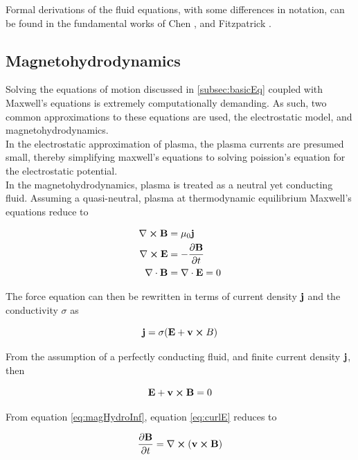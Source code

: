 Formal derivations of the fluid equations, with some differences in notation, can be found in the fundamental works of Chen \parencite{Chen2018}, and Fitzpatrick \parencite{Fitzpatrick2015}.

\subsection{Magnetohydrodynamics}
Solving the equations of motion discussed in \ref{subsec:basicEq} coupled with Maxwell's equations is extremely computationally demanding. As such, two common approximations to these equations are used, the electrostatic model, and magnetohydrodynamics.
\\
In the electrostatic approximation of plasma, the plasma currents are presumed small, thereby simplifying maxwell's equations to solving poission's equation for the electrostatic potential.
\\
In the magnetohydrodynamics, plasma is treated as a neutral yet conducting fluid. Assuming a quasi-neutral, plasma at thermodynamic equilibrium Maxwell's equations \parencite[Ch. 9-9-1]{Hockney1988} reduce to

\begin{subequations}
    \begin{align}
        \nabla \cross \vb{B} &= \mu_0 \vb{j} \\
        \nabla \cross \vb{E} &= - \pdv{\vb{B}}{t} \label{eq:curlE}\\
        \nabla \cdot \vb{B} &= \nabla \cdot \vb{E} = 0    
    \end{align}
\end{subequations}

The force equation can then be rewritten in terms of current density $\vb{j}$ and the conductivity $\sigma$ as

\begin{equation}\label{eq:maghydroCurr}
    \vb{j} = \sigma (\vb{E} + \vb{v} \cross{B})    
\end{equation}

From the assumption of a perfectly conducting fluid, and finite current density $\vb{j}$, then 

\begin{equation}\label{eq:magHydroInf}
    \vb{E} + \vb{v} \cross \vb{B} = 0
\end{equation}

 From equation \eqref{eq:magHydroInf}, equation \eqref{eq:curlE} reduces to

\begin{equation}
    \pdv{\vb{B}}{t} = \nabla \cross (\vb{v} \cross \vb{B})
\end{equation}

